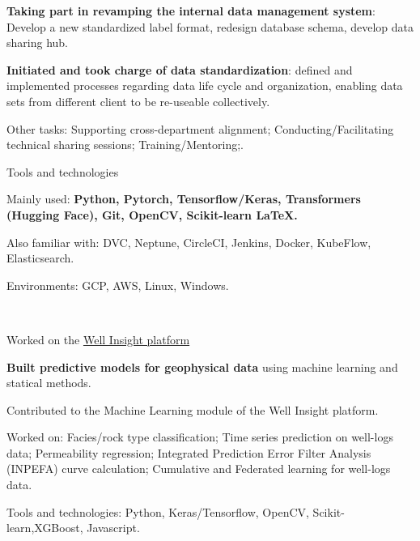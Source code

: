 \begin{xitemize}
\begin{zitemize}
        \item \textbf{Taking part in revamping the internal data management system}: Develop a new standardized label format, redesign database schema, develop data sharing hub.
        \item \textbf{Initiated and took charge of data standardization}: defined and implemented processes regarding data life cycle and organization, enabling data sets from different client to be re-useable collectively.
    \end{zitemize}
    \item Other tasks: Supporting cross-department alignment; Conducting/Facilitating technical sharing sessions; Training/Mentoring;.
    \item Tools and technologies
    \begin{zitemize}
        \item Mainly used: \textbf{Python, Pytorch, Tensorflow/Keras, Transformers (Hugging Face), Git, OpenCV, Scikit-learn \LaTeX.}
        \item Also familiar with: DVC, Neptune, CircleCI, Jenkins, Docker, KubeFlow, Elasticsearch.
        \item Environments: GCP, AWS, Linux, Windows.
    \end{zitemize}
\end{xitemize}

\\
\vspace{-.2em}
\begin{xitemize}
    \item Worked on the \href{https://www.i2g.cloud/well-insight}{Well Insight platform \faUpRightFromSquare}
    \begin{zitemize}
        \item \textbf{Built predictive models for geophysical data} using machine learning and statical methods.
        \item Contributed to the Machine Learning module of the Well Insight platform.
        \item Worked on: Facies/rock type classification; Time series prediction on well-logs data; Permeability regression; Integrated Prediction Error Filter Analysis (INPEFA) curve calculation; Cumulative and Federated learning for well-logs data.
    \end{zitemize}
    \item Tools and technologies: Python, Keras/Tensorflow, OpenCV, Scikit-learn,XGBoost, Javascript.
\end{xitemize}

